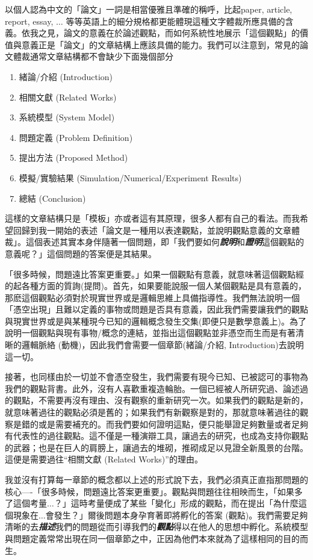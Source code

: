 \documentclass[12pt]{report}
\theoremstyle{plain}
\begin{document}
以個人認為中文的「論文」一詞是相當優雅且準確的稱呼，比起paper, article, report, essay, $\dots$ 等等英語上的細分規格都更能體現這種文字體裁所應具備的含義。依我之見，論文的意義在於論述觀點，而如何系統性地展示「這個觀點」的價值與意義正是「論文」的文章結構上應該具備的能力。我們可以注意到，常見的論文體裁通常文章結構都不會缺少下面幾個部分
\begin{enumerate}
    \item 緒論/介紹 (Introduction)
    \item 相關文獻 (Related Works)
    \item 系統模型 (System Model)
    \item 問題定義 (Problem Definition)
    \item 提出方法 (Proposed Method)
    \item 模擬/實驗結果 (Simulation/Numerical/Experiment Results)
    \item 總結 (Conclusion)
\end{enumerate}
這樣的文章結構只是「模板」亦或者這有其原理，很多人都有自己的看法。而我希望回歸到我一開始的表述「論文是一種用以表達觀點，並說明觀點意義的文章體裁」。這個表述其實本身伴隨著一個問題，即「我們要如何\textbf{\textit{說明}}和\textbf{\textit{證明}}這個觀點的意義呢？」這個問題的答案便是其結果。

「很多時候，問題遠比答案更重要。」如果一個觀點有意義，就意味著這個觀點經的起各種方面的質詢(提問)。首先，如果要能說服一個人某個觀點是具有意義的，那麽這個觀點必須對於現實世界或是邏輯思維上具備指導性。我們無法說明一個「憑空出現」且難以定義的事物或問題是否具有意義，因此我們需要讓我們的觀點與現實世界或是與某種現今已知的邏輯概念發生交集(即便只是數學意義上)。為了說明一個觀點與現有事物/概念的連結，並指出這個觀點並非憑空而生而是有著清晰的邏輯脈絡 (動機)，因此我們會需要一個章節(緒論/介紹, Introduction)去說明這一切。

接著，也同樣由於一切並不會憑空發生，我們需要有現今已知、已被認可的事物為我們的觀點背書。此外，沒有人喜歡重複造輪胎。一個已經被人所研究過、論述過的觀點，不需要再沒有理由、沒有觀察的重新研究一次。如果我們的觀點是新的，就意味著過往的觀點必須是舊的；如果我們有新觀察是對的，那就意味著過往的觀察是錯的或是需要補充的。而我們要如何證明這點，便只能舉證足夠數量或者足夠有代表性的過往觀點。這不僅是一種演辯工具，讓過去的研究，也成為支持你觀點的武器；也是在巨人的肩膀上，讓過去的堆砌，推砌成足以見證全新風景的台階。這便是需要過往``相關文獻 (Related Works)''的理由。

我並沒有打算每一章節的概念都以上述的形式說下去，我們必須真正直指那問題的核心----「很多時候，問題遠比答案更重要」。觀點與問題往往相映而生，「如果多了這個考量$\dots$？」這時考量便成了某些「變化」形成的觀點，而在提出「為什麼這個現象在$\dots$會發生？」爾後問題本身孕育著即將孵化的答案 (觀點)。我們需要足夠清晰的去\textbf{\textit{描述}}我們的問題從而引導我們的\textbf{\textit{觀點}}得以在他人的思想中孵化。系統模型與問題定義常常出現在同一個章節之中，正因為他們本來就為了這樣相同的目的而生。
\end{document}
